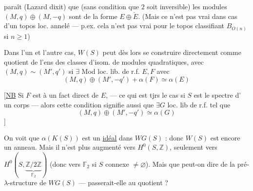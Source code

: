 paraît (Lazard dixit) que (sans condition que
$2$ soit inversible) les modules $(M,q)\oplus(M,-q)$
sont de la forme  $E\oplus\check E$. (Mais ce n'est pas
vrai dans   cas d'un topos loc. annelé —
p.ex. cela n'est pas vrai pour le topos classifiant
$B_{O(n)}$ si $n\ge1$)

Dans l'un et l'autre cas, $W(S)$ peut
dès lors se construire directement comme
quotient de l'ens des classes d'isom.
de modules quadratiques, avec
$(M,q)\sim(M',q')$ si 
 
$\exists$ Mod loc. lib. de r.f. $E,F$ avec
\[
(M,q)\oplus(M',-q')+\alpha(F)\simeq\alpha(E)
\]

[\uline{NB} Si $F$ est  à un fact direct de $E$,
— ce qui est tjrs le cas si $S$ est le spectre d'
un corps —  alors cette condition signifie
aussi que $\exists G$ loc. lib de r.f. tel que
\[
(M,q)\oplus(M',-q')\simeq\alpha(G)
\]
]

On voit que $\alpha(K(S))$ est un \uline{idéal} dans
$WG(S)$ : donc $W(S)$ est encore un anneau.
Mais il n'est plus augmenté vers $H^0(S,\mathbb Z)$,
seulement vers $H^0(S,\underbrace{\mathbb Z/2\mathbb Z}_{\mathbb F_2})$ (donc vers
$\mathbb F_2$ si $S$ connexe $\ne\varnothing$). Mais que peut-on
dire de la pré-$\lambda$-structure de $WG(S)$
— passerait-elle au quotient ?

